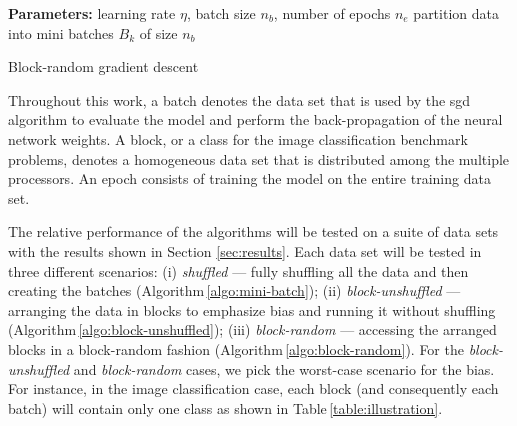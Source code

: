 \documentclass[review]{elsarticle}
\begin{document}
\begin{algorithm}[H]
    \DontPrintSemicolon
    \textbf{Parameters:} learning rate $\eta$, batch size $n_b$, number of epochs $n_e$\;
    \SetAlgoLined
    partition data into mini batches $B_k$ of size $n_b$\;
    \caption{Block-random gradient descent}\label{algo:block-random}
\end{algorithm}

Throughout this work, a batch denotes the data set that is used by the
\gls{sgd} algorithm to evaluate the model and perform the
back-propagation of the neural network weights. A block, or a class
for the image classification benchmark problems, denotes a homogeneous
data set that is distributed among the multiple processors. An epoch
consists of training the model on the entire training data set.

The relative performance of the algorithms will be tested on a suite
of data sets with the results shown in Section \ref{sec:results}. Each
data set will be tested in three different scenarios: (i)
\textit{shuffled} --- fully shuffling all the data and then creating
the batches (Algorithm\,\ref{algo:mini-batch}); (ii)
\textit{block-unshuffled} --- arranging the data in blocks to
emphasize bias and running it without shuffling
(Algorithm\,\ref{algo:block-unshuffled}); (iii) \textit{block-random}
--- accessing the arranged blocks in a block-random fashion
(Algorithm\,\ref{algo:block-random}). For the
\textit{block-unshuffled} and \textit{block-random} cases, we pick the
worst-case scenario for the bias. For instance, in the image
classification case, each block (and consequently each batch) will
contain only one class as shown in Table\,\ref{table:illustration}.
\end{document}
